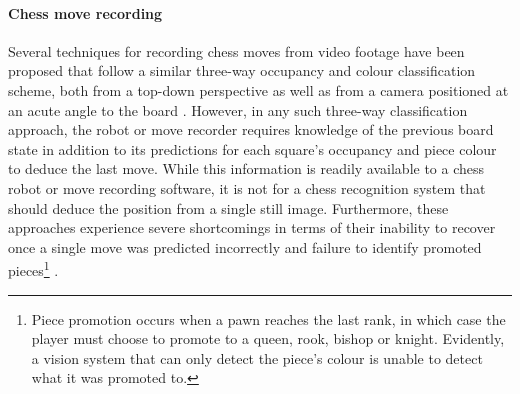 \paragraph{Chess move recording}
Several techniques for recording chess moves from video footage have been proposed that follow a similar three-way occupancy and colour classification scheme, both from a top-down perspective \cite{sokic2008,wang2013} as well as from a camera positioned at an acute angle to the board \cite{hack2014}.
However, in any such three-way classification approach, the robot or move recorder requires knowledge of the previous board state in addition to its predictions for each square's occupancy and piece colour to deduce the last move. 
While this information is readily available to a chess robot or move recording software, it is not for a chess recognition system that should deduce the position from a single still image.
Furthermore, these approaches experience severe shortcomings in terms of their inability to recover once a single move was predicted incorrectly and failure to identify promoted pieces\footnote{Piece promotion occurs when a pawn reaches the last rank, in which case the player must choose to promote to a queen, rook, bishop or knight. Evidently, a vision system that can only detect the piece's colour is unable to detect what it was promoted to.} \cite{cour2002}.

